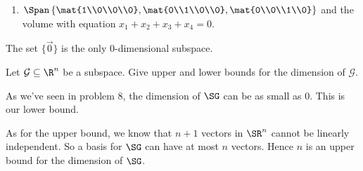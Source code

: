 \begin{exercises}
\begin{problist}
\begin{solution}
\begin{enumerate}[label=(\roman*)]
				\item $\Span\left\{\mat{1\\0\\0\\0},\mat{0\\1\\0\\0},\mat{0\\0\\1\\0}\right\}$ and the volume with equation $x_1+x_2+x_3+x_4=0$.
			\end{enumerate}

			The set $\{\vec 0\}$ is the only 0-dimensional subspace.
		\end{solution}

		\prob Let $\mathcal G\subseteq \R^n$ be a subspace.
		Give upper and lower bounds for the dimension of $\mathcal G$.
		\begin{solution}
			As we've seen in problem 8, the dimension of $\SG$ can be as small as $0$. This is our lower bound.

			As for the upper bound, we know that $n+1$ vectors in $\SR^n$ cannot be linearly independent. So a basis for $\SG$ can have at most $n$ vectors. Hence $n$ is an upper bound for the dimension of $\SG$.
		\end{solution}
	\end{problist}
\end{exercises}
